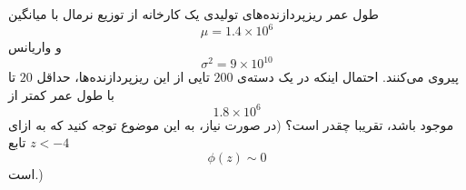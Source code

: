 \problem{}
طول عمر ریزپردازنده‌های تولیدی یک کارخانه از توزیع نرمال با میانگین
\[
\mu = 1.4 \times 10^6
\]
و واریانس
\[
\sigma^2 = 9 \times 10^{10}
\]
پیروی می‌کنند. احتمال اینکه در یک دسته‌ی $200$ تایی از این
 ریزپردازنده‌ها، حداقل  $20$ تا با طول عمر کمتر از
\[
1.8 \times 10^6
\]
موجود باشد، تقریبا چقدر است؟ (در صورت نیاز، به این موضوع
 توجه کنید که به ازای \( z < -4 \) تابع 
\[
\phi(z) \sim 0
\]
است.)
